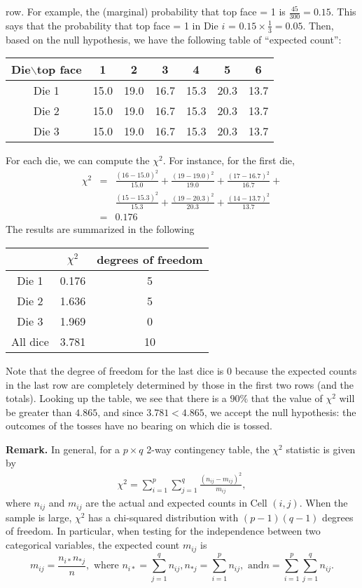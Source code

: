 \documentclass[12pt]{article}
\begin{document}
\begin{enumerate}
 row.  For example, the (marginal) probability that top face = 1 is
 $\frac{45}{300}=0.15$.  This says that the probability that top face = 1
 in Die $i$ = $0.15\times\frac{1}{3}=0.05$.  Then, based on the
 null hypothesis, we have the following table of ``expected count'':
\begin{center}
\begin{tabular}{|c|c|c|c|c|c|c|}
\hline
Die$\backslash$top face & 1 & 2 & 3 & 4 & 5 & 6 \\
\hline
Die 1 & 15.0 & 19.0 & 16.7 & 15.3 & 20.3 & 13.7 \\
\hline
Die 2 & 15.0 & 19.0 & 16.7 & 15.3 & 20.3 & 13.7 \\
\hline
Die 3 & 15.0 & 19.0 & 16.7 & 15.3 & 20.3 & 13.7 \\
\hline
\end{tabular}
\end{center}
For each die, we can compute the $\chi^2$.  For instance, for the
first die,
\begin{eqnarray*}
\chi^2&=&\frac{(16-15.0)^2}{15.0}+\frac{(19-19.0)^2}{19.0}+
\frac{(17-16.7)^2}{16.7}+\\
&&\frac{(15-15.3)^2}{15.3}+
\frac{(19-20.3)^2}{20.3}+\frac{(14-13.7)^2}{13.7}\\&=&0.176
\end{eqnarray*}
The results are summarized in the following
\begin{center}
\begin{tabular}{|c|c|c|}
\hline
& $\chi^2$ & degrees of freedom \\
\hline
Die 1 & 0.176 & 5 \\
\hline
Die 2 & 1.636 & 5 \\
\hline
Die 3 & 1.969 & 0 \\
\hline
All dice & 3.781 & 10 \\
\hline
\end{tabular}
\end{center}
Note that the degree of freedom for the last dice is 0 because the
expected counts in the last row are completely determined by those
in the first two rows (and the totals).  Looking up the table, we
see that there is a $90\%$ that the value of $\chi^2$ will be
greater than $4.865$, and since $3.781<4.865$, we accept the null
hypothesis: the outcomes of the tosses have no bearing on which die
is tossed.
\end{enumerate}
\textbf{Remark.} In general, for a $p\times q$ 2-way contingency
table, the $\chi^2$ statistic is given by
\begin{eqnarray}
\chi^2=\sum_{i=1}^{p}\sum_{j=1}^{q}\frac{(n_{ij}-m_{ij})^2}{m_{ij}},
\end{eqnarray}
where $n_{ij}$ and $m_{ij}$ are the actual and expected counts in
Cell $(i,j)$.  When the sample is large, $\chi^2$ has a chi-squared
distribution with $(p-1)(q-1)$ degrees of freedom.  In particular,
when testing for the independence between two categorical variables,
the expected count $m_{ij}$ is
$$m_{ij}=\frac{n_{i*}n_{*j}}{n},\mbox{ where }
n_{i*}=\sum_{j=1}^{q}n_{ij},\mbox{
}n_{*j}=\sum_{i=1}^{p}n_{ij},\mbox{ and
}n=\sum_{i=1}^{p}\sum_{j=1}^{q}n_{ij}.$$
\end{document}
